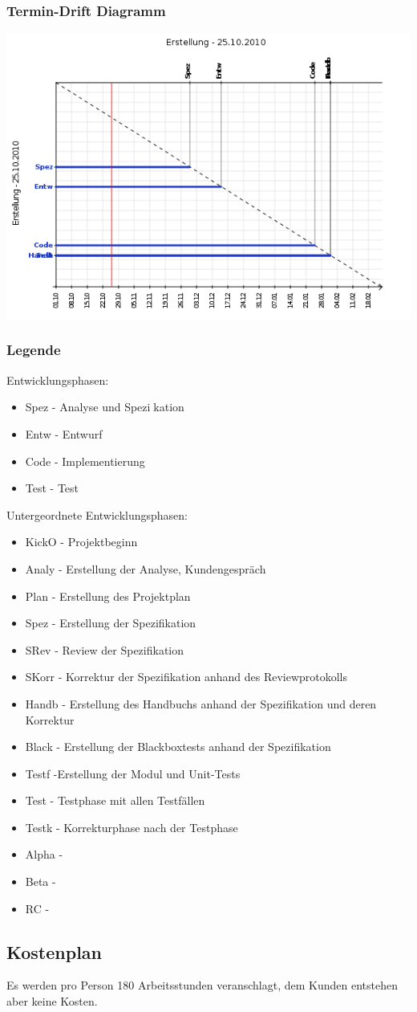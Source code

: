 \documentclass[a4paper,10pt]{scrartcl}
\begin{document}
\subsubsection{Termin-Drift Diagramm}
\includegraphics[width=15cm]{termindrift.png}
\subsubsection{Legende}
Entwicklungsphasen:
\begin{itemize}
\item Spez - Analyse und Spezikation
\item Entw - Entwurf
\item Code - Implementierung
\item Test - Test
\end{itemize}
Untergeordnete Entwicklungsphasen:
\begin{itemize}
\item KickO - Projektbeginn
\item Analy - Erstellung der Analyse, Kundengespräch
\item Plan - Erstellung des Projektplan
\item Spez - Erstellung der Spezifikation
\item SRev - Review der Spezifikation
\item SKorr - Korrektur der Spezifikation anhand des Reviewprotokolls
\item Handb - Erstellung des Handbuchs anhand der Spezifikation und deren Korrektur
\item Black - Erstellung der Blackboxtests anhand der Spezifikation
\item Testf -Erstellung der Modul und Unit-Tests 
\item Test - Testphase mit allen Testfällen
\item Testk - Korrekturphase nach der Testphase
\item Alpha - 
\item Beta - 
\item RC -  

\end{itemize}
\subsection{Kostenplan}
Es werden pro Person 180 Arbeitsstunden veranschlagt, dem Kunden entstehen aber keine Kosten.
\end{document}

